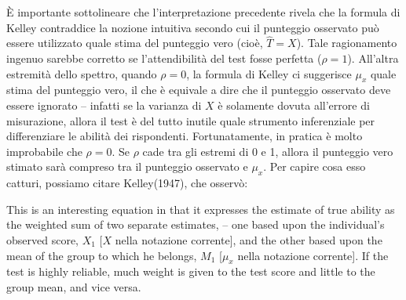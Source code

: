 È importante sottolineare che l'interpretazione precedente rivela che la formula di Kelley contraddice la nozione intuitiva secondo cui il punteggio osservato può essere utilizzato quale stima del punteggio vero (cioè, $\hat{T} = X$). Tale ragionamento ingenuo sarebbe corretto se l'attendibilità del test fosse perfetta ($\rho = 1$). All'altra estremità dello spettro, quando $\rho = 0$, la formula di Kelley ci suggerisce $\mu_x$ quale stima del punteggio vero, il che è equivale a dire che il punteggio osservato deve essere ignorato -- infatti se la varianza di $X $ è solamente dovuta all'errore di misurazione, allora il test è del tutto inutile quale strumento inferenziale per differenziare le abilità dei rispondenti. Fortunatamente, in pratica è molto improbabile che $\rho = 0$. Se $\rho$ cade tra gli estremi di 0 e 1, allora il punteggio vero stimato sarà compreso tra il punteggio osservato e $\mu_x$. Per capire cosa esso catturi, possiamo citare Kelley(1947), che osservò:
\begin{displayquote}
This is an interesting equation in that it expresses the estimate of true ability as the weighted sum of two separate estimates, -- one based upon the individual's observed score, $X_1$ [$X$ nella notazione corrente], and the other based upon the mean of the group to which he belongs, $M_1$ [$\mu_x$ nella notazione corrente]. 
If the test is highly reliable, much weight is given to the test score and little to the group mean, and vice versa. 
\end{displayquote}


